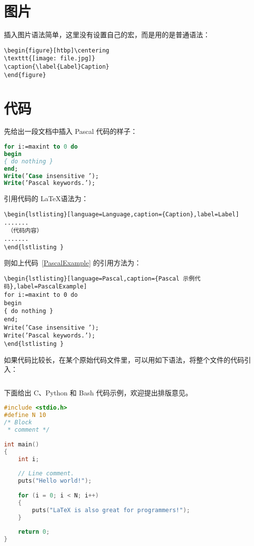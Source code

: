\section{图片}
插入图片语法简单，这里没有设置自己的宏，而是用的是普通语法：
\begin{lstlisting}[language={[LaTeX]TeX},caption={插入图片语法示例}]
\begin{figure}[htbp]\centering
\texttt{[image: file.jpg]} 
\caption{\label{Label}Caption}
\end{figure}\end{lstlisting}

\section{代码}
先给出一段文档中插入 Pascal 代码的样子：
\begin{lstlisting}[language=Pascal,caption={Pascal 代码示例},label=PascalExample]
for i:=maxint to 0 do
begin
{ do nothing }
end;
Write(’Case insensitive ’);
Write(’Pascal keywords.’);
\end{lstlisting}

引用代码的 \LaTeX 语法为：
\begin{lstlisting}[language={[LaTeX]TeX},caption={引用代码的语法}]
\begin{lstlisting}[language=Language,caption={Caption},label=Label]
.......
 （代码内容）
.......
\end{lstlisting }\end{lstlisting}

则如上代码~\ref{PascalExample} 的引用方法为：
\begin{lstlisting}[language={[LaTeX]TeX},caption={引用代码示例}]
\begin{lstlisting}[language=Pascal,caption={Pascal 示例代码},label=PascalExample]
for i:=maxint to 0 do
begin
{ do nothing }
end;
Write(’Case insensitive ’);
Write(’Pascal keywords.’);
\end{lstlisting }
\end{lstlisting}

如果代码比较长，在某个原始代码文件里，可以用如下语法，将整个文件的代码引入：
\begin{lstlisting}[language={[LaTeX]TeX},caption={引入代码文件示例}]

\end{lstlisting}

下面给出 C、Python 和 Bash 代码示例，欢迎提出排版意见。

\begin{lstlisting}[language=C,caption={C 代码示例},label=cLabel]
#include <stdio.h>
#define N 10
/* Block
 * comment */
 
int main()
{
    int i;
 
    // Line comment.
    puts("Hello world!");
 
    for (i = 0; i < N; i++)
    {
        puts("LaTeX is also great for programmers!");
    }
 
    return 0;
}
\end{lstlisting}

